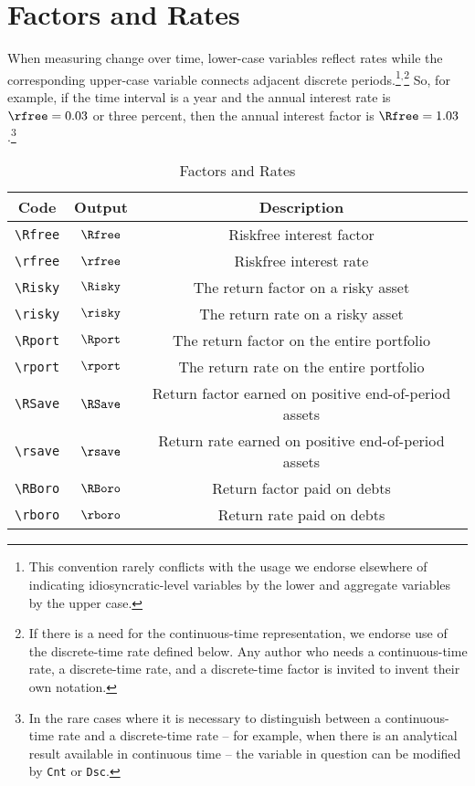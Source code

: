 \documentclass[12pt]{\econtex}
\begin{document}
\section{Factors and Rates}
When measuring change over time, lower-case variables reflect rates
while the corresponding upper-case variable connects adjacent discrete periods.\footnote{This
  convention rarely conflicts with the usage we endorse elsewhere of
  indicating idiosyncratic-level variables by the lower and aggregate
  variables by the upper case.}$^{,}$\footnote{If there is a need for the continuous-time 
  representation, we endorse use of the discrete-time rate defined below.  Any
  author who needs a continuous-time rate, a discrete-time rate, and a discrete-time factor
  is invited to invent their own notation.}  So, for example, if the time interval is a year and the annual interest rate is $\rfree=0.03$ or three percent, then 
the annual interest factor is $\Rfree=1.03$.\footnote{In the rare cases where it is necessary to distinguish between a continuous-time rate and a discrete-time rate -- for example, when there is an analytical result available in continuous time -- the variable in question can be modified by \texttt{Cnt} or \texttt{Dsc}.}


\begin{table}[ht]
  \centering
  \begin{tabular}{|ccc|} 		
    \hline
    Code    & Output & Description 
    \\ \hline 
    \verb|\Rfree| & $\Rfree$     & Riskfree interest factor
    \\ \verb|\rfree| & $\rfree$     & Riskfree interest rate
    \\ \verb|\Risky| & $\Risky$     & The return factor on a risky asset
    \\ \verb|\risky| & $\risky$     & The return rate on a risky asset
    \\ \verb|\Rport| & $\Rport$     & The return factor on the entire portfolio
    \\ \verb|\rport| & $\rport$     & The return rate on the entire portfolio
    \\ \verb|\RSave| & $\RSave$     & Return factor earned on positive end-of-period assets
    \\ \verb|\rsave| & $\rsave$     & Return rate earned on positive end-of-period assets
    \\ \verb|\RBoro| & $\RBoro$     & Return factor paid on debts
    \\ \verb|\rboro| & $\rboro$     & Return rate paid on debts 
    \\	\hline
  \end{tabular}
  \caption{Factors and Rates}
  \label{table:Factors}
\end{table}	
\end{document}
